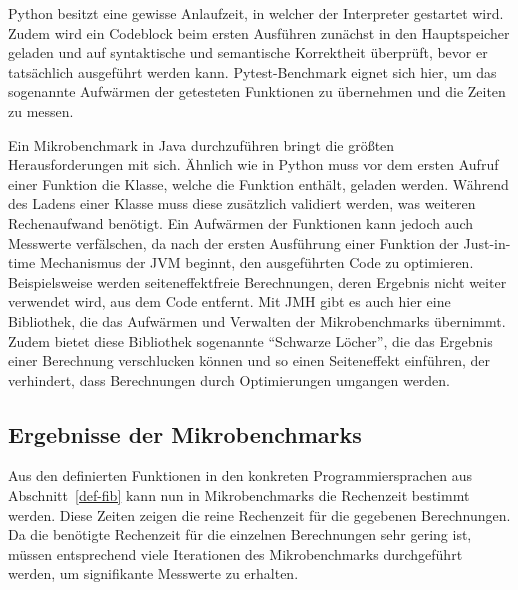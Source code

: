 \documentclass[11pt, parskip=half]{scrartcl}       %
\begin{document}
Python besitzt eine gewisse Anlaufzeit, in welcher der Interpreter gestartet wird.
Zudem wird ein Codeblock beim ersten Ausführen zunächst in den Hauptspeicher geladen und auf syntaktische und semantische Korrektheit überprüft, bevor er tatsächlich ausgeführt werden kann.
Pytest-Benchmark\cite{pytest_benchmark} eignet sich hier, um das sogenannte Aufwärmen der getesteten Funktionen zu übernehmen und die Zeiten zu messen.

Ein Mikrobenchmark in Java durchzuführen bringt die größten Herausforderungen mit sich.\cite{oracle_avoiding_benchmarking_pitfalls}
Ähnlich wie in Python muss vor dem ersten Aufruf einer Funktion die Klasse, welche die Funktion enthält, geladen werden.
Während des Ladens einer Klasse muss diese zusätzlich validiert werden, was weiteren Rechenaufwand benötigt.
Ein Aufwärmen der Funktionen kann jedoch auch Messwerte verfälschen, da nach der ersten Ausführung einer Funktion der Just-in-time Mechanismus der JVM beginnt, den ausgeführten Code zu optimieren.
Beispielsweise werden seiteneffektfreie Berechnungen, deren Ergebnis nicht weiter verwendet wird, aus dem Code entfernt.
Mit JMH\cite{openjdk_jmh} gibt es auch hier eine Bibliothek, die das Aufwärmen und Verwalten der Mikrobenchmarks übernimmt.
Zudem bietet diese Bibliothek sogenannte ``Schwarze Löcher'', die das Ergebnis einer Berechnung verschlucken können und so einen Seiteneffekt einführen, der verhindert, dass Berechnungen durch Optimierungen umgangen werden.

\subsection{Ergebnisse der Mikrobenchmarks}

Aus den definierten Funktionen in den konkreten Programmiersprachen aus Abschnitt~\ref{def-fib} kann nun in Mikrobenchmarks die Rechenzeit bestimmt werden.
Diese Zeiten zeigen die reine Rechenzeit für die gegebenen Berechnungen.
Da die benötigte Rechenzeit für die einzelnen Berechnungen sehr gering ist, müssen entsprechend viele Iterationen des Mikrobenchmarks durchgeführt werden, um signifikante Messwerte zu erhalten.
\end{document}
